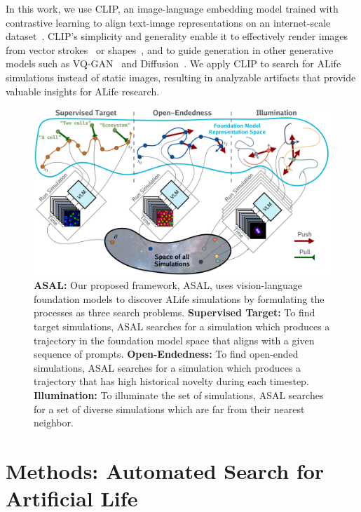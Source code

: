 \documentclass{article}
\begin{document}
In this work, we use CLIP, an image-language embedding model trained with contrastive learning to align text-image representations on an internet-scale dataset~\citep{radford2021learning}.
CLIP’s simplicity and generality enable it to effectively render images from vector strokes~\citep{frans2022clipdraw} or shapes~\citep{tian2022modern}, and to guide generation in other generative models such as VQ-GAN~\citep{crowson2022vqgan} and Diffusion~\citep{kim2022diffusionclip}.
We apply CLIP to search for ALife simulations instead of static images, resulting in analyzable artifacts that provide valuable insights for ALife research.


\begin{figure}[!h]
    \centering
    \includegraphics[width=\textwidth]{figs/methods_figure_compressed.pdf}
    \caption{
    \textbf{ASAL:}
    Our proposed framework, ASAL, uses vision-language foundation models to discover ALife simulations by formulating the processes as three search problems.
    \textbf{Supervised Target:}
    To find target simulations, ASAL searches for a simulation which produces a trajectory in the foundation model space that aligns with a given sequence of prompts.
    \textbf{Open-Endedness:}
    To find open-ended simulations, ASAL searches for a simulation which produces a trajectory that has high historical novelty during each timestep.
    \textbf{Illumination:}
    To illuminate the set of simulations, ASAL searches for a set of diverse simulations which are far from their nearest neighbor.
    }
    \label{fig:method_overview}
\end{figure}



\section{Methods: Automated Search for Artificial Life}
\end{document}
